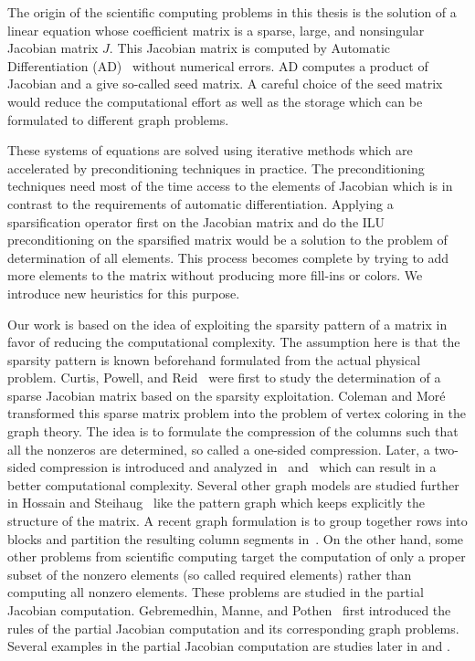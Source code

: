 \documentclass[12pt, twoside,a4paper,toc=bibliography]{scrbook}
\begin{document}
The origin of the scientific computing problems in this thesis is the solution of a linear equation whose coefficient matrix is a sparse, large, and nonsingular Jacobian matrix $J$. 
This Jacobian matrix is computed by Automatic Differentiation (AD)~\cite{Griewank2008EDP,Rall1981ADT} without numerical errors.
AD computes a product of Jacobian and a give so-called seed matrix.
A careful choice of the seed matrix would reduce the computational effort as well as 
the storage which can be formulated to different graph problems.

These systems of equations are solved using iterative methods which are accelerated by preconditioning techniques in practice.
The preconditioning techniques need most of the time access to
the elements of Jacobian which is in contrast to the requirements of automatic differentiation.
Applying a sparsification operator first on the Jacobian matrix and do the ILU preconditioning
on the sparsified matrix would be a solution to the problem of determination of
all elements. This process becomes complete by trying to add more elements to the matrix
without producing more fill-ins or colors. We introduce new heuristics for this purpose.

Our work is based on the idea of exploiting the sparsity pattern of a matrix in favor of 
reducing the computational complexity. The assumption here is that the sparsity pattern is
known beforehand formulated from the actual physical problem.
Curtis, Powell, and Reid~\cite{Curtis1974117} were first to study the determination of 
a sparse Jacobian matrix based on the sparsity exploitation.
Coleman and Mor{\'e}~\cite{Coleman1983EoS} transformed this sparse matrix problem
into the problem of vertex coloring in the graph theory. The idea is to formulate
the compression of the columns such that all the nonzeros are determined, so called
a one-sided compression.
Later, a two-sided compression is introduced and analyzed in~\cite{Coleman1996SaE}
and~\cite{hs:csj} which can result in a better computational complexity.
Several other graph models are studied further in Hossain and Steihaug~\cite{hs:gmei} 
like the pattern graph which keeps explicitly the structure of the matrix.
A recent graph formulation is to group together rows into blocks 
and partition the resulting column segments in~\cite{optimal_diret_determination}.
On the other hand, some other problems from scientific computing target the computation
of only a proper subset of the nonzero elements (so called required elements)
rather than computing all nonzero elements.
These problems are studied in the partial Jacobian computation.
Gebremedhin, Manne, and Pothen~\cite{Gebremedhin05whatcolor} first introduced
the rules of the partial Jacobian computation and its corresponding graph problems. 
Several examples in the partial Jacobian computation are studies later in
\cite{CalotoiuMaster} and \cite{LulfesmannMaster}. 
\end{document}
